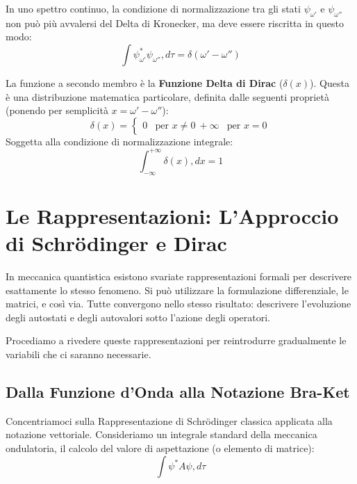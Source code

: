 In uno spettro continuo, la condizione di normalizzazione tra gli stati $\psi_{\omega'}$ e $\psi_{\omega''}$ non può più avvalersi del Delta di Kronecker, ma deve essere riscritta in questo modo:
\begin{equation}
\int \psi_{\omega'}^* \psi_{\omega''} , d\tau = \delta(\omega' - \omega'')
\end{equation}

La funzione a secondo membro è la \textbf{Funzione Delta di Dirac} ($\delta(x)$).
Questa è una distribuzione matematica particolare, definita dalle seguenti proprietà (ponendo per semplicità $x = \omega' - \omega''$):
\begin{equation}
\delta(x) =
\begin{cases}
0 & \text{per } x \neq 0 \
+\infty & \text{per } x = 0
\end{cases}
\end{equation}
Soggetta alla condizione di normalizzazione integrale:
\begin{equation}
\int_{-\infty}^{+\infty} \delta(x) , dx = 1
\end{equation}

\section{Le Rappresentazioni: L'Approccio di Schrödinger e Dirac}

In meccanica quantistica esistono svariate rappresentazioni formali per descrivere esattamente lo stesso fenomeno. Si può utilizzare la formulazione differenziale, le matrici, e così via. Tutte convergono nello stesso risultato: descrivere l'evoluzione degli autostati e degli autovalori sotto l'azione degli operatori.

Procediamo a rivedere queste rappresentazioni per reintrodurre gradualmente le variabili che ci saranno necessarie.

\subsection{Dalla Funzione d'Onda alla Notazione Bra-Ket}

Concentriamoci sulla Rappresentazione di Schrödinger classica applicata alla notazione vettoriale.
Consideriamo un integrale standard della meccanica ondulatoria, il calcolo del valore di aspettazione (o elemento di matrice):
\begin{equation}
\int \psi^* A \psi , d\tau
\end{equation}

